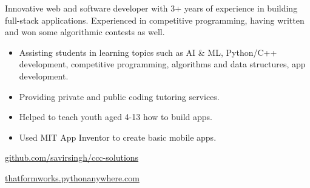 \documentclass[8pt,a4paper]{altacv}
\begin{document}




Innovative web and software developer with 3+ years of experience in building full-stack applications.
Experienced in competitive programming, having written and won some algorithmic contests as well.



\begin{itemize}
\item Assisting students in learning topics such as AI \& ML, Python/C++ development, competitive programming, algorithms and data structures, app development.
\item Providing private and public coding tutoring services.
\end{itemize}

\divider

\begin{itemize}
\item Helped to teach youth aged 4-13 how to build apps.
\item Used MIT App Inventor to create basic mobile apps.
\end{itemize}

\divider
\smallskip



\divider

\href{https://github.com/savirsingh/ccc-solutions}{github.com/savirsingh/ccc-solutions}

\divider

\href{https://thatformworks.pythonanywhere.com}{thatformworks.pythonanywhere.com}
\end{document}
